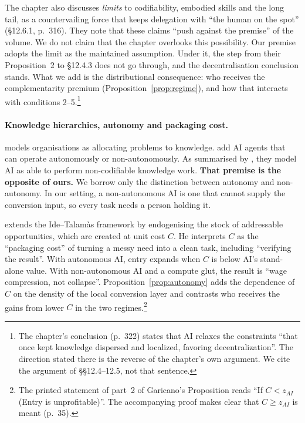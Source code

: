\documentclass[12pt]{article}
\theoremstyle{remark}
\begin{document}
The chapter also discusses \emph{limits} to codifiability, embodied skills and the long tail, as a countervailing force that keeps delegation with ``the human on the spot'' (\S12.6.1, p.~316). They note that these claims ``push against the premise'' of the volume. We do not claim that the chapter overlooks this possibility. Our premise adopts the limit as the maintained assumption. Under it, the step from their Proposition~2 to \S12.4.3 does not go through, and the decentralisation conclusion stands. What we add is the distributional consequence: who receives the complementarity premium (Proposition~\ref{prop:regime}), and how that interacts with conditions 2--5.\footnote{The chapter's conclusion (p.~322) states that AI relaxes the constraints ``that once kept knowledge dispersed and localized, favoring decentralization''. The direction stated there is the reverse of the chapter's own argument. We cite the argument of \S\S12.4--12.5, not that sentence.}

\paragraph{Knowledge hierarchies, autonomy and packaging cost.} \citet{garicano2000hierarchies} models organisations as allocating problems to knowledge. \citet{ide2025knowledge} add AI agents that can operate autonomously or non-autonomously. As summarised by \citet[p.~179]{chatterji2026firms}, they model AI as able to perform non-codifiable knowledge work. \textbf{That premise is the opposite of ours.} We borrow only the distinction between autonomy and non-autonomy. In our setting, a non-autonomous AI is one that cannot supply the conversion input, so every task needs a person holding it.

\citet[pp.~33--35]{garicano2026comment} extends the Ide--Talamàs framework by endogenising the stock of addressable opportunities, which are created at unit cost $C$. He interprets $C$ as the ``packaging cost'' of turning a messy need into a clean task, including ``verifying the result''. With autonomous AI, entry expands when $C$ is below AI's stand-alone value. With non-autonomous AI and a compute glut, the result is ``wage compression, not collapse''. Proposition~\ref{prop:autonomy} adds the dependence of $C$ on the density of the local conversion layer and contrasts who receives the gains from lower $C$ in the two regimes.\footnote{The printed statement of part~2 of Garicano's Proposition reads ``If $C<z_{AI}$ (Entry is unprofitable)''. The accompanying proof makes clear that $C\ge z_{AI}$ is meant (p.~35).}
\end{document}

